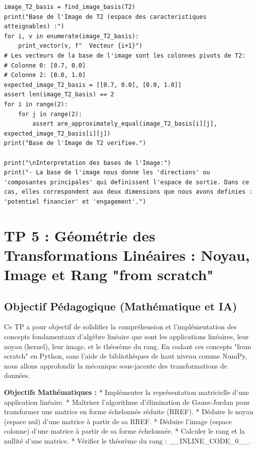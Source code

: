 \documentclass{report}
\begin{document}
\begin{verbatim}
image_T2_basis = find_image_basis(T2)
print("Base de l'Image de T2 (espace des caracteristiques atteignables) :")
for i, v in enumerate(image_T2_basis):
    print_vector(v, f"  Vecteur {i+1}")
# Les vecteurs de la base de l'image sont les colonnes pivots de T2:
# Colonne 0: [0.7, 0.0]
# Colonne 2: [0.0, 1.0]
expected_image_T2_basis = [[0.7, 0.0], [0.0, 1.0]]
assert len(image_T2_basis) == 2
for i in range(2):
    for j in range(2):
        assert are_approximately_equal(image_T2_basis[i][j], expected_image_T2_basis[i][j])
print("Base de l'Image de T2 verifiee.")

print("\nInterpretation des bases de l'Image:")
print("- La base de l'image nous donne les 'directions' ou 'composantes principales' qui definissent l'espace de sortie. Dans ce cas, elles correspondent aux deux dimensions que nous avons definies : 'potentiel financier' et 'engagement'.")
\end{verbatim}

\newpage
\chapter*{TP 5 : Géométrie des Transformations Linéaires : Noyau, Image et Rang "from scratch"}

\section*{Objectif Pédagogique (Mathématique et IA)}

Ce TP a pour objectif de solidifier la compréhension et l'implémentation des concepts fondamentaux d'algèbre linéaire que sont les applications linéaires, leur noyau (kernel), leur image, et le théorème du rang. En codant ces concepts "from scratch" en Python, sans l'aide de bibliothèques de haut niveau comme NumPy, nous allons approfondir la mécanique sous-jacente des transformations de données.

\textbf{Objectifs Mathématiques :}
*   Implémenter la représentation matricielle d'une application linéaire.
*   Maîtriser l'algorithme d'élimination de Gauss-Jordan pour transformer une matrice en forme échelonnée réduite (RREF).
*   Déduire le noyau (espace nul) d'une matrice à partir de sa RREF.
*   Déduire l'image (espace colonne) d'une matrice à partir de sa forme échelonnée.
*   Calculer le rang et la nullité d'une matrice.
*   Vérifier le théorème du rang : \_\_INLINE\_CODE\_0\_\_.
\end{document}
